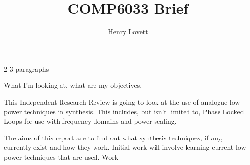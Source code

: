 \documentclass[12pt]{article}
\author{Henry Lovett}
\title{COMP6033 Brief}
\begin{document}
\maketitle


2-3 paragraphs

What I'm looking at, what are my objectives.

This Independent Research Review is going to look at the use of analogue low power techniques in synthesis.
This includes, but isn't limited to, Phase Locked Loops for use with frequency domains and power scaling.

The aims of this report are to find out what synthesis techniques, if any, currently exist and how they work.
Initial work will involve learning current low power techniques that are used. 
Work 
\end{document}
